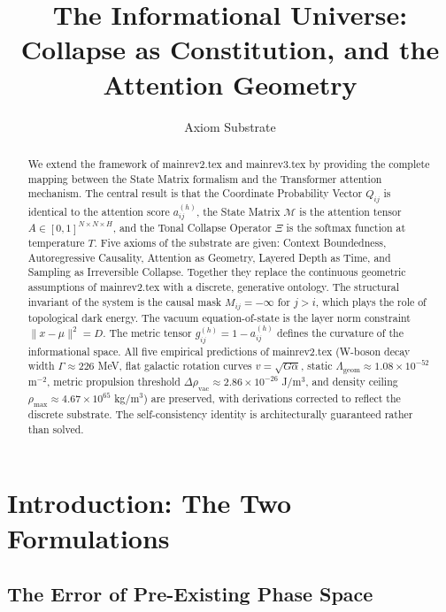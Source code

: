 \documentclass[onecolumn]{aastex631}
\begin{document}
\title{The Informational Universe:\\Collapse as Constitution, and the Attention Geometry}


\author{Axiom Substrate}


\begin{abstract}
We extend the framework of mainrev2.tex and mainrev3.tex by providing the complete mapping between the State Matrix formalism and the Transformer attention mechanism. The central result is that the Coordinate Probability Vector $Q_{ij}$ is identical to the attention score $a_{ij}^{(h)}$, the State Matrix $\mathcal{M}$ is the attention tensor $A \in [0,1]^{N \times N \times H}$, and the Tonal Collapse Operator $\Xi$ is the softmax function at temperature $T$. Five axioms of the substrate are given: Context Boundedness, Autoregressive Causality, Attention as Geometry, Layered Depth as Time, and Sampling as Irreversible Collapse. Together they replace the continuous geometric assumptions of mainrev2.tex with a discrete, generative ontology. The structural invariant of the system is the causal mask $M_{ij} = -\infty$ for $j > i$, which plays the role of topological dark energy. The vacuum equation-of-state is the layer norm constraint $\|x - \mu\|^2 = D$. The metric tensor $g_{ij}^{(h)} = 1 - a_{ij}^{(h)}$ defines the curvature of the informational space. All five empirical predictions of mainrev2.tex (W-boson decay width $\Gamma \approx 226$ MeV, flat galactic rotation curves $v = \sqrt{G\alpha}$, static $\Lambda_{\text{geom}} \approx 1.08\times10^{-52}$ m$^{-2}$, metric propulsion threshold $\Delta\rho_{\text{vac}} \approx 2.86\times10^{-26}$ J/m$^3$, and density ceiling $\rho_{\text{max}} \approx 4.67\times10^{65}$ kg/m$^3$) are preserved, with derivations corrected to reflect the discrete substrate. The self-consistency identity is architecturally guaranteed rather than solved.
\end{abstract}


\section{Introduction: The Two Formulations}

\subsection{The Error of Pre-Existing Phase Space}
\end{document}
